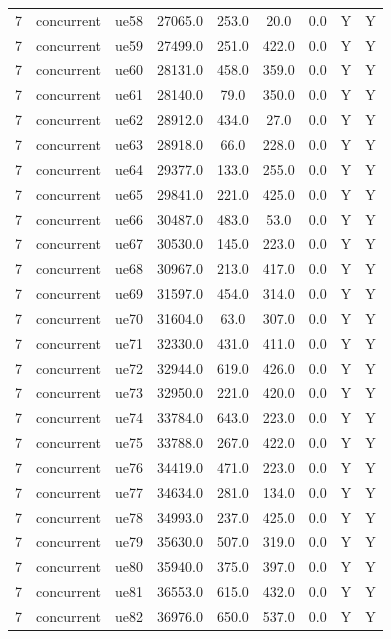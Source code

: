 \begin{table}[ht]
\begin{tabular}{|c|c|c|c|c|c|c|c|c|}
7 & concurrent & ue58 & 27065.0 & 253.0 & 20.0 & 0.0 & Y & Y \\
7 & concurrent & ue59 & 27499.0 & 251.0 & 422.0 & 0.0 & Y & Y \\
7 & concurrent & ue60 & 28131.0 & 458.0 & 359.0 & 0.0 & Y & Y \\
7 & concurrent & ue61 & 28140.0 & 79.0 & 350.0 & 0.0 & Y & Y \\
7 & concurrent & ue62 & 28912.0 & 434.0 & 27.0 & 0.0 & Y & Y \\
7 & concurrent & ue63 & 28918.0 & 66.0 & 228.0 & 0.0 & Y & Y \\
7 & concurrent & ue64 & 29377.0 & 133.0 & 255.0 & 0.0 & Y & Y \\
7 & concurrent & ue65 & 29841.0 & 221.0 & 425.0 & 0.0 & Y & Y \\
7 & concurrent & ue66 & 30487.0 & 483.0 & 53.0 & 0.0 & Y & Y \\
7 & concurrent & ue67 & 30530.0 & 145.0 & 223.0 & 0.0 & Y & Y \\
7 & concurrent & ue68 & 30967.0 & 213.0 & 417.0 & 0.0 & Y & Y \\
7 & concurrent & ue69 & 31597.0 & 454.0 & 314.0 & 0.0 & Y & Y \\
7 & concurrent & ue70 & 31604.0 & 63.0 & 307.0 & 0.0 & Y & Y \\
7 & concurrent & ue71 & 32330.0 & 431.0 & 411.0 & 0.0 & Y & Y \\
7 & concurrent & ue72 & 32944.0 & 619.0 & 426.0 & 0.0 & Y & Y \\
7 & concurrent & ue73 & 32950.0 & 221.0 & 420.0 & 0.0 & Y & Y \\
7 & concurrent & ue74 & 33784.0 & 643.0 & 223.0 & 0.0 & Y & Y \\
7 & concurrent & ue75 & 33788.0 & 267.0 & 422.0 & 0.0 & Y & Y \\
7 & concurrent & ue76 & 34419.0 & 471.0 & 223.0 & 0.0 & Y & Y \\
7 & concurrent & ue77 & 34634.0 & 281.0 & 134.0 & 0.0 & Y & Y \\
7 & concurrent & ue78 & 34993.0 & 237.0 & 425.0 & 0.0 & Y & Y \\
7 & concurrent & ue79 & 35630.0 & 507.0 & 319.0 & 0.0 & Y & Y \\
7 & concurrent & ue80 & 35940.0 & 375.0 & 397.0 & 0.0 & Y & Y \\
7 & concurrent & ue81 & 36553.0 & 615.0 & 432.0 & 0.0 & Y & Y \\
7 & concurrent & ue82 & 36976.0 & 650.0 & 537.0 & 0.0 & Y & Y \\

\end{tabular}
\end{table}

